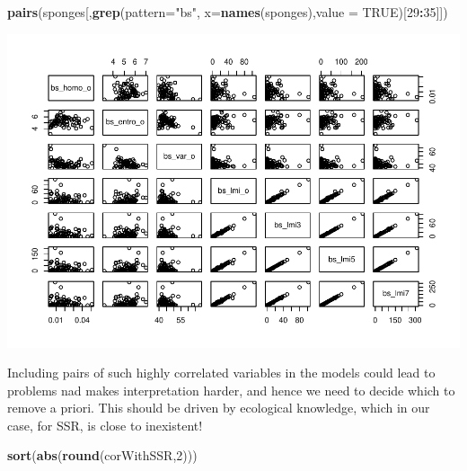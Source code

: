 \documentclass[
]{book}
\newenvironment{Shaded}{\begin{snugshade}}{\end{snugshade}}
\newcommand{\AttributeTok}[1]{\textcolor[rgb]{0.13,0.29,0.53}{#1}}
\newcommand{\ConstantTok}[1]{\textcolor[rgb]{0.56,0.35,0.01}{#1}}
\newcommand{\DecValTok}[1]{\textcolor[rgb]{0.00,0.00,0.81}{#1}}
\newcommand{\FunctionTok}[1]{\textcolor[rgb]{0.13,0.29,0.53}{\textbf{#1}}}
\newcommand{\NormalTok}[1]{#1}
\newcommand{\SpecialCharTok}[1]{\textcolor[rgb]{0.81,0.36,0.00}{\textbf{#1}}}
\newcommand{\StringTok}[1]{\textcolor[rgb]{0.31,0.60,0.02}{#1}}
\begin{document}
\begin{Shaded}
\begin{Highlighting}[]
\FunctionTok{pairs}\NormalTok{(sponges[,}\FunctionTok{grep}\NormalTok{(}\AttributeTok{pattern=}\StringTok{"bs"}\NormalTok{, }\AttributeTok{x=}\FunctionTok{names}\NormalTok{(sponges),}\AttributeTok{value =} \ConstantTok{TRUE}\NormalTok{)[}\DecValTok{29}\SpecialCharTok{:}\DecValTok{35}\NormalTok{]])}
\end{Highlighting}
\end{Shaded}

\includegraphics{ECOMODbook_files/figure-latex/unnamed-chunk-89-3.pdf}

Including pairs of such highly correlated variables in the models could lead to problems nad makes interpretation harder, and hence we need to decide which to remove a priori. This should be driven by ecological knowledge, which in our case, for SSR, is close to inexistent!

\begin{Shaded}
\begin{Highlighting}[]
\FunctionTok{sort}\NormalTok{(}\FunctionTok{abs}\NormalTok{(}\FunctionTok{round}\NormalTok{(corWithSSR,}\DecValTok{2}\NormalTok{)))}
\end{Highlighting}
\end{Shaded}
\end{document}
